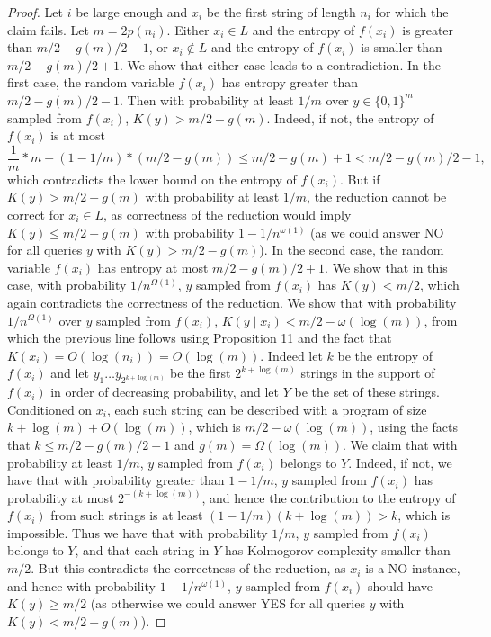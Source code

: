\documentclass[10pt,a4paper]{article}
\begin{document}
\begin{proof}
Let $i$ be large enough and $x_i$ be the first string of length $n_i$ for which the claim fails. Let $m=2p(n_i)$. Either $x_i\in L$ and the entropy of $f(x_i)$ is greater than $m/2-g(m)/2-1$, or $x_i\notin L$ and the entropy of $f(x_i)$ is smaller than $m/2-g(m)/2+1$. We show that either case leads to a contradiction.
In the first case, the random variable $f(x_i)$ has entropy greater than $m/2-g(m)/2-1$. Then with probability at least $1/m$ over $y\in\{0,1\}^m$ sampled from $f(x_i)$, $K(y)>m/2-g(m)$. Indeed, if not, the entropy of $f(x_i)$ is at most
\[\frac1m*m+(1-1/m)*(m/2-g(m))\leq m/2-g(m)+1<m/2-g(m)/2-1,\]
which contradicts the lower bound on the entropy of $f(x_i)$. But if $K(y)>m/2-g(m)$ with probability at least $1/m$, the reduction cannot be correct for $x_i\in L$, as correctness of the reduction would imply $K(y)\leq m/2-g(m)$ with probability $1-1/n^{\omega(1)}$ (as we could answer NO for all queries $y$ with $K(y)>m/2-g(m)$).
In the second case, the random variable $f(x_i)$ has entropy at most $m/2-g(m)/2+1$. We show that in this case, with probability $1/n^{\Omega(1)}$, $y$ sampled from $f(x_i)$ has $K(y)<m/2$, which again contradicts the correctness of the reduction.
We show that with probability $1/n^{\Omega(1)}$ over $y$ sampled from $f(x_i)$, $K(y\mid x_i)<m/2-\omega(\log(m))$, from which the previous line follows using Proposition 11 and the fact that $K(x_i)=O(\log(n_i))=O(\log(m))$. Indeed let $k$ be the entropy of $f(x_i)$ and let $y_1\ldots y_{2^{k+\log(m)}}$ be the first $2^{k+\log(m)}$ strings in the support of $f(x_i)$ in order of decreasing probability, and let $Y$ be the set of these strings. Conditioned on $x_i$, each such string can be described with a program of size $k+\log(m)+O(\log(m))$, which is $m/2-\omega(\log(m))$, using the facts that $k\leq m/2-g(m)/2+1$ and $g(m)=\Omega(\log(m))$. We claim that with probability at least $1/m$, $y$ sampled from $f(x_i)$ belongs to $Y$. Indeed, if not, we have that with probability greater than $1-1/m$, $y$ sampled from $f(x_i)$ has probability at most $2^{-(k+\log(m))}$, and hence the contribution to the entropy of $f(x_i)$ from such strings is at least $(1-1/m)(k+\log(m))>k$, which is impossible.
Thus we have that with probability $1/m$, $y$ sampled from $f(x_i)$ belongs to $Y$, and that each string in $Y$ has Kolmogorov complexity smaller than $m/2$. But this contradicts the correctness of the reduction, as $x_i$ is a NO instance, and hence with probability $1-1/n^{\omega(1)}$, $y$ sampled from $f(x_i)$ should have $K(y)\geq m/2$ (as otherwise we could answer YES for all queries $y$ with $K(y)<m/2-g(m)$).
\end{proof}
\end{document}
